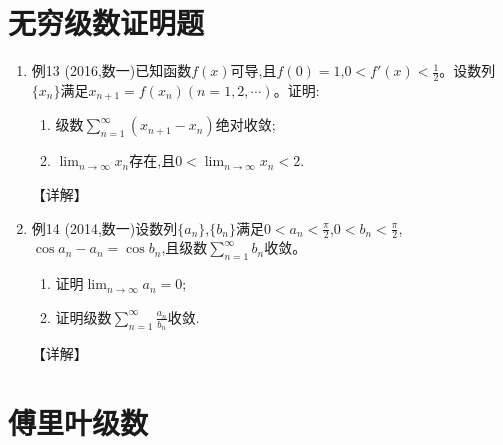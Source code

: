\documentclass[12pt, a4paper, oneside, UTF8]{ctexbook}
\begin{document}
\section{无穷级数证明题}

\begin{enumerate}[label=\arabic*.,start=13]
    \item 例13 (2016,数一)已知函数$f(x)$可导,且$f(0)=1$,$0<f'(x)<\frac{1}{2}$。设数列$\{x_n\}$满足$x_{n+1}=f(x_n)(n=1,2,\cdots)$。证明:
    \begin{enumerate}[label=(\roman*)]
        \item 级数$\sum_{n=1}^{\infty}(x_{n+1}-x_n)$绝对收敛;
        \item $\lim_{n\rightarrow\infty} x_n$存在,且$0<\lim_{n\rightarrow\infty} x_n<2$.
    \end{enumerate}
    
    \begin{solution}
    【详解】
    \end{solution}
    
    \item 例14 (2014,数一)设数列$\{a_n\}$,$\{b_n\}$满足$0<a_n<\frac{\pi}{2}$,$0<b_n<\frac{\pi}{2}$,$\cos a_n-a_n=\cos b_n$,且级数$\sum_{n=1}^{\infty} b_n$收敛。
    \begin{enumerate}[label=(\roman*)]
        \item 证明$\lim_{n\rightarrow\infty} a_n=0$;
        \item 证明级数$\sum_{n=1}^{\infty}\frac{a_n}{b_n}$收敛.
    \end{enumerate}
    
    \begin{solution}
    【详解】
    \end{solution}
\end{enumerate}

\section{傅里叶级数}
\end{document}
